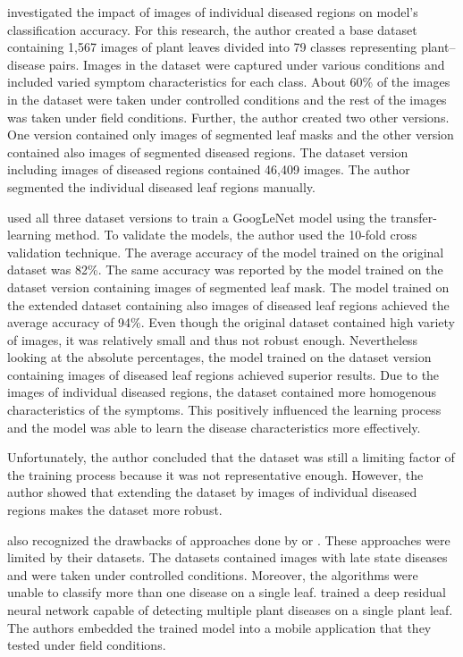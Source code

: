 \documentclass{BachelorBUI}
\begin{document}
        \textcite{Barbedo:2019} investigated the impact of images of individual diseased regions on model's classification accuracy. For this research, the author created a base dataset containing 1,567 images of plant leaves divided into 79 classes representing plant--disease pairs. Images in the dataset were captured under various conditions and included varied symptom characteristics for each class. About 60\% of the images in the dataset were taken under controlled conditions and the rest of the images was taken under field conditions. Further, the author created two other versions. One version contained only images of segmented leaf masks and the other version contained also images of segmented diseased regions. The dataset version including images of diseased regions contained 46,409 images. The author segmented the individual diseased leaf regions manually.

        \textcite{Barbedo:2019} used all three dataset versions to train a GoogLeNet model using the transfer-learning method. To validate the models, the author used the 10-fold cross validation technique. The average accuracy of the model trained on the original dataset was 82\%. The same accuracy was reported by the model trained on the dataset version containing images of segmented leaf mask. The model trained on the extended dataset containing also images of diseased leaf regions achieved the average accuracy of 94\%. Even though the original dataset contained high variety of images, it was relatively small and thus not robust enough. Nevertheless looking at the absolute percentages, the model trained on the dataset version containing images of diseased leaf regions achieved superior results. Due to the images of individual diseased regions, the dataset contained more homogenous characteristics of the symptoms. This positively influenced the learning process and the model was able to learn the disease characteristics more effectively.

        Unfortunately, the author concluded that the dataset was still a limiting factor of the training process because it was not representative enough. However, the author showed that extending the dataset by images of individual diseased regions makes the dataset more robust.

        \textcite{Picon:2019} also recognized the drawbacks of approaches done by \textcite{Mohanty:2016} or \textcite{Sladojevic:2016}. These approaches were limited by their datasets. The datasets contained images with late state diseases and were taken under controlled conditions. Moreover, the algorithms were unable to classify more than one disease on a single leaf. \textcite{Picon:2019} trained a deep residual neural network capable of detecting multiple plant diseases on a single plant leaf. The authors embedded the trained model into a mobile application that they tested under field conditions.
\end{document}
